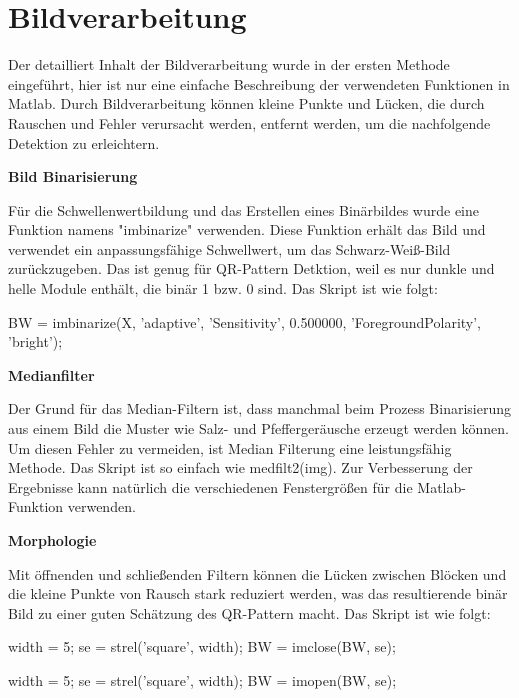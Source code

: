 \section{Bildverarbeitung} 
Der detailliert Inhalt der Bildverarbeitung wurde in der ersten Methode eingeführt, hier ist nur eine einfache Beschreibung der verwendeten Funktionen in Matlab. Durch Bildverarbeitung können kleine Punkte und Lücken, die durch Rauschen und Fehler verursacht werden, entfernt werden, um die nachfolgende Detektion zu erleichtern.

\textbf{Bild Binarisierung}

Für die Schwellenwertbildung und das Erstellen eines Binärbildes wurde eine Funktion namens "imbinarize" verwenden. Diese Funktion erhält das Bild und verwendet ein anpassungsfähige Schwellwert, um das Schwarz-Weiß-Bild zurückzugeben. Das ist genug für QR-Pattern Detktion, weil es nur dunkle und helle Module enthält, die binär 1 bzw. 0 sind. Das Skript ist wie folgt:

\singlespacing
\begin{matlab}[firstnumber=1, name=MATLABCodeBeispiel, caption={MATLAB Code Binarisierung}, label={lst:MATLABCodeBinarisierung}]

BW = imbinarize(X, 'adaptive', 'Sensitivity', 0.500000, 'ForegroundPolarity', 'bright');

\end{matlab}
\onehalfspacing

\textbf{Medianfilter}

Der Grund für das Median-Filtern ist, dass manchmal beim Prozess Binarisierung aus einem Bild die Muster wie Salz- und Pfeffergeräusche erzeugt werden können. Um diesen Fehler zu vermeiden, ist Median Filterung eine leistungsfähig Methode. Das Skript ist so einfach wie medfilt2(img). Zur Verbesserung der Ergebnisse kann natürlich die verschiedenen Fenstergrößen für die Matlab-Funktion verwenden.

\textbf{Morphologie}

Mit öffnenden und schließenden Filtern können die Lücken zwischen Blöcken und die kleine Punkte von Rausch stark reduziert werden, was das resultierende binär Bild zu einer guten Schätzung des QR-Pattern macht. Das Skript ist wie folgt:

\singlespacing
\begin{matlab}[firstnumber=1, name=MATLABCodeBeispiel, caption={MATLAB Code Beispiel}, label={lst:MATLABCodeBeispiel}]
width = 5;
se = strel('square', width);
BW = imclose(BW, se);

width = 5;
se = strel('square', width);
BW = imopen(BW, se);

\end{matlab}
\onehalfspacing

